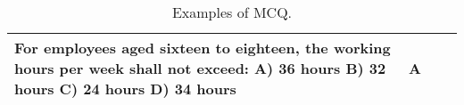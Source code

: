 \begin{table*}[ht]
\begin{tabular}{|p{2cm}|p{5cm}|p{5cm}|p{1cm}|}
For employees aged sixteen to eighteen, the working hours per week shall not exceed:\newline
A) 36 hours\newline
B) 32 hours\newline
C) 24 hours\newline
D) 34 hours\newline&
A \\ \hline
\end{tabular}
\caption{Examples of MCQ.}
\label{tab:mcq_samples}
\end{table*}
\clearpage

